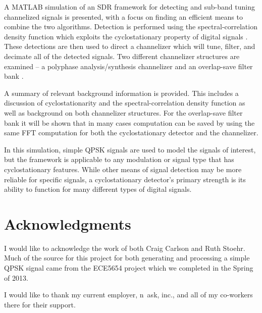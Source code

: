 \documentclass[12pt,dvips]{report}
\begin{document}
A MATLAB simulation of an SDR framework for detecting and sub-band tuning channelized signals is presented, with a focus on finding an efficient means to combine the two algorithms. Detection is performed using the spectral-correlation density function which exploits the cyclostationary property of digital signals \cite{Gardner1}.  These detections are then used to direct a channelizer which will tune, filter, and decimate all of the detected signals. Two different channelizer structures are examined – a polyphase analysis/synthesis channelizer \cite{Harris1} and an overlap-save filter bank \cite{Borgerding1}.

A summary of relevant background information is provided.  This includes a discussion of cyclostationarity and the spectral-correlation density function as well as background on both channelizer structures. For the overlap-save filter bank it will be shown that in many cases computation can be saved by using the same FFT computation for both the cyclostationary detector and the channelizer.

In this simulation, simple QPSK signals are used to model the signals of interest, but the framework is applicable to any modulation or signal type that has cyclostationary features. While other means of signal detection may be more reliable for specific signals, a cyclostationary detector's primary strength is its ability to function for many different types of digital signals.


\vfill



\pagebreak

\chapter*{Acknowledgments}
I would like to acknowledge the work of both Craig Carlson and Ruth Stoehr. Much of the source for this project for both generating and processing a simple 
QPSK signal came from the ECE5654 project which we completed in the Spring 
of 2013.

I would like to thank my current employer, n~ask, inc., and all of my co-workers
there for their support.
\end{document}
